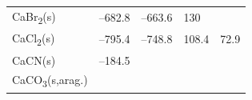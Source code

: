 \documentclass[
  9pt,
]{extbook}
\theoremstyle{definition}
\theoremstyle{definition}
\theoremstyle{definition}
\theoremstyle{remark}
\begin{document}
\begin{longtable}[]{@{}lllll@{}}
\begin{minipage}[t]{0.10\columnwidth}
CaBr\textsubscript{2}(s)\strut
\end{minipage} & \begin{minipage}[t]{0.19\columnwidth}\raggedright
--682.8\strut
\end{minipage} & \begin{minipage}[t]{0.20\columnwidth}\raggedright
--663.6\strut
\end{minipage} & \begin{minipage}[t]{0.18\columnwidth}\raggedright
130\strut
\end{minipage} & \begin{minipage}[t]{0.18\columnwidth}\raggedright
\strut
\end{minipage}\tabularnewline
\begin{minipage}[t]{0.10\columnwidth}\raggedright
CaCl\textsubscript{2}(s)\strut
\end{minipage} & \begin{minipage}[t]{0.19\columnwidth}\raggedright
--795.4\strut
\end{minipage} & \begin{minipage}[t]{0.20\columnwidth}\raggedright
--748.8\strut
\end{minipage} & \begin{minipage}[t]{0.18\columnwidth}\raggedright
108.4\strut
\end{minipage} & \begin{minipage}[t]{0.18\columnwidth}\raggedright
72.9\strut
\end{minipage}\tabularnewline
\begin{minipage}[t]{0.10\columnwidth}\raggedright
CaCN(s)\strut
\end{minipage} & \begin{minipage}[t]{0.19\columnwidth}\raggedright
--184.5\strut
\end{minipage} & \begin{minipage}[t]{0.20\columnwidth}\raggedright
\strut
\end{minipage} & \begin{minipage}[t]{0.18\columnwidth}\raggedright
\strut
\end{minipage} & \begin{minipage}[t]{0.18\columnwidth}\raggedright
\strut
\end{minipage}\tabularnewline
\begin{minipage}[t]{0.10\columnwidth}\raggedright
CaCO\textsubscript{3}(s,arag.)\strut
\end{minipage} & \begin{minipage}[t]{0.19\columnwidth}\raggedright

\end{minipage}
\end{longtable}
\end{document}
